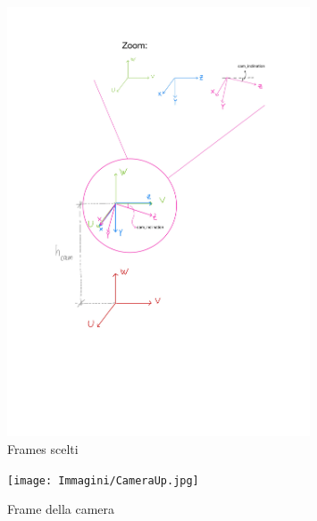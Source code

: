 \begin{figure}[H]
	\centering
	\includegraphics[width=0.8\textwidth]{Immagini/RoboticsFrames-2.jpg}
	\caption{Frames scelti}
	\label{fig:frames}
\end{figure}

\begin{figure}[H]
	\centering
	\texttt{[image: Immagini/CameraUp.jpg]}
	\caption{Frame della camera}
	\label{fig:camera_up}
\end{figure}


